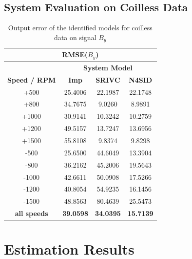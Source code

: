 \documentclass[english]{isasthesis}
\begin{document}
	\section{System Evaluation on Coilless Data}
	\begin{table}[h]
		 \centering
	\begin{tabular}{|c|c|c|c|}
	\hline
	\multicolumn{4}{|c|}{\textbf{RMSE($B_y$)}}                        \\ \hline\hline
	\textbf{}            & \multicolumn{3}{c|}{\textbf{System Model}} \\ \hline
	\textbf{Speed / RPM} & \textbf{Imp}          & \textbf{SRIVC}         & \textbf{N4SID}       \\ 		\hline
	+500                 & 25.4006      & 22.1987       & 22.1748     \\ \cline{1-1}
	+800                 & 34.7675      & 9.0260       & 8.9891     \\ \cline{1-1}
	+1000                & 30.9141      & 10.3242      & 10.2759    \\ \cline{1-1}
	+1200                & 49.5157      & 13.7247       & 13.6956     \\ \cline{1-1}
	+1500                & 55.8108     & 9.8374       & 9.8298    \\ \cline{1-1}
	-500                 & 25.6500      & 44.6049       & 13.3904     \\ \cline{1-1}
	-800                 & 36.2162      & 45.2006      & 19.5643     \\ \cline{1-1}
	-1000                & 42.6611      & 50.0908       & 17.5266     \\ \cline{1-1}
	-1200                & 40.8054      & 54.9235       & 16.1456     \\ \cline{1-1}
	-1500                & 48.8563      & 80.4639      & 25.5473     \\ \hline\hline
	\textbf{all speeds}  & \textbf{39.0598}      & \textbf{34.0395}       & \textbf{15.7139}     \\ 		\hline
	\end{tabular}
	\caption{Output error of the identified models for coilless data on signal $B_y$}
	\label{appendix:sid results coilless}
	\end{table}
	\chapter{Estimation Results}
\end{document}
